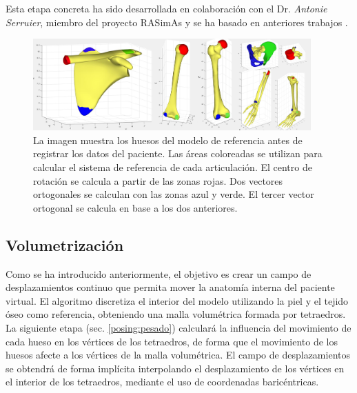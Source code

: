 Esta etapa concreta ha sido desarrollada en colaboración con el Dr. \emph{Antonie Serruier}, miembro del proyecto \ac{RASimAs} y se ha basado en anteriores trabajos \cite{QUIJANO20131703}.

\begin{figure}
   \centering
    \includegraphics[width=0.95\textwidth]{IMG/rigshoulder.png}%
    \caption{La imagen muestra los huesos del modelo de referencia antes de registrar los datos del paciente. Las áreas coloreadas se utilizan para calcular el sistema de referencia de cada articulación. El centro de rotación se calcula a partir de las zonas rojas. Dos vectores ortogonales se calculan con las zonas azul y verde. El tercer vector ortogonal se calcula en base a los dos anteriores.}
\label{fig:humero}
\end{figure}


\subsection{Volumetrización}
\label{posing:volumetrizacion}
%
Como se ha introducido anteriormente, el objetivo es crear un campo de desplazamientos continuo que permita mover la anatomía interna del paciente virtual. El algoritmo discretiza el interior del modelo utilizando la piel y el tejido óseo como referencia, obteniendo una malla volumétrica formada por tetraedros. %
La siguiente etapa (sec. \ref{posing:pesado}) calculará la influencia del movimiento de cada hueso en los vértices de los tetraedros, de forma que el movimiento de los huesos afecte a los vértices de la malla volumétrica. El campo de desplazamientos se obtendrá de forma implícita interpolando el desplazamiento de los vértices en el interior de los tetraedros, mediante el uso de coordenadas baricéntricas. %



